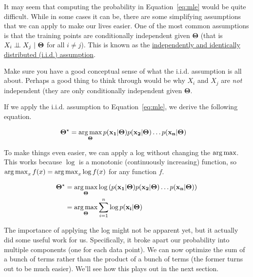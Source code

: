 \documentclass[assignment04_Solutions]{subfiles}
\begin{document}
It may seem that computing the probability in Equation~\ref{eq:mle} would be quite difficult.   While in some cases it can be, there are some simplifying assumptions that we can apply to make our lives easier.  One of the most common assumptions is that the training points are conditionally independent given $\mathbf{\Theta}$ (that is $X_i \perp\!\!\!\perp X_j~|~\mathbf{\Theta}$ for all $i \neq j$).  This is known as the \href{https://en.wikipedia.org/wiki/Independent_and_identically_distributed_random_variables}{independently and identically distributed (i.i.d.) assumption}.

\begin{understandingcheck}
Make sure you have a good conceptual sense of what the i.i.d. assumption is all about.  Perhaps a good thing to think through would be why $X_i$ and $X_j$ are \emph{not} independent (they are only conditionally independent given $\mathbf{\Theta}$.
\end{understandingcheck}

If we apply the i.i.d. assumption to Equation~\ref{eq:mle}, we derive the following equation.

\begin{align}
\mathbf{\Theta^\star} &= \operatorname*{arg\,max}_{\mathbf{\Theta}} p(\mathbf{x_1} |  \mathbf{\Theta}) p(\mathbf{x_2} | \mathbf{\Theta}) \ldots p(\mathbf{x_n} | \mathbf{\Theta}) \label{eq:mleiid}
\end{align}

To make things even easier, we can apply a log without changing the $\operatorname*{arg\,max}$.  This works because $\log$ is a monotonic (continuously increasing) function, so $\operatorname*{arg\,max}_x f(x) = \operatorname*{arg\,max}_x \log  f(x)$ for any function $f$.


\begin{align}
\mathbf{\Theta^\star} &= \operatorname*{arg\,max}_{\mathbf{\Theta}} \log \left ( p(\mathbf{x_1} |  \mathbf{\Theta}) p(\mathbf{x_2} | \mathbf{\Theta}) \ldots p(\mathbf{x_n} | \mathbf{\Theta})  \right) \nonumber \\
&=  \operatorname*{arg\,max}_{\mathbf{\Theta}} \sum_{i=1}^n \log p(\mathbf{x_i} |  \mathbf{\Theta})  \label{eq:mleiidlog}
\end{align}

The importance of applying the log might not be apparent yet, but it actually did some useful work for us.  Specifically, it broke apart our probability into multiple components (one for each data point).  We can now optimize the sum of a bunch of terms rather than the product  of a bunch of terms (the former turns out to be much easier).  We'll see how this plays out in the next section.
\end{document}
